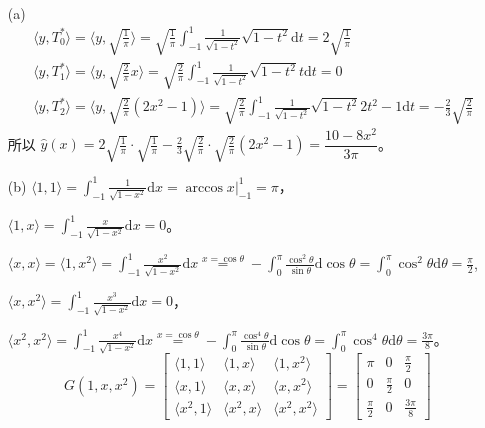 \documentclass[lang=cn,a4paper,newtx,bibend=bibtex]{elegantpaper}
\newcommand{\dd}{\mathrm{d}}
\newcommand{\upset}[2]{\stackrel{#1}{#2}}
\newcommand{\Int}[4]{\int_{#1}^{#2}{#3}{\dd {#4}}}
\newcommand{\indot}[2]{\langle {#1}, {#2} \rangle}
\begin{document}
\begin{solution} ~~

\begin{enumerate}
\item[(a)] 
\begin{equation*}
\begin{aligned}
  &\indot{y}{T_0^*} = \indot{y}{\sqrt{\frac1{\pi}}} = \sqrt{\frac{1}{\pi}} \int_{-1}^1 \frac{1}{\sqrt{1 - t^2}} \sqrt{1 - t^2} \dd t = 2 \sqrt{\frac{1}{\pi}} \\
  &\indot{y}{T_1^*} = \indot{y}{\sqrt{\frac2{\pi}}x} = \sqrt{\frac{2}{\pi}} \int_{-1}^1 \frac{1}{\sqrt{1 - t^2}} \sqrt{1 - t^2} t \dd t = 0 \\
  &\indot{y}{T_2^*} = \indot{y}{\sqrt{\frac2{\pi}}(2x^2 - 1)} = \sqrt{\frac{2}{\pi}} \int_{-1}^1 \frac{1}{\sqrt{1 - t^2}}\sqrt{1 - t^2} 2t^2 - 1 \dd t = - \frac23 \sqrt{\frac2{\pi}}
\end{aligned}
\end{equation*}
所以 $\hat{y}(x) = 2\sqrt{\frac1{\pi}}\cdot\sqrt{\frac{1}{\pi}} - \frac23 \sqrt{\frac{2}{\pi}}\cdot\sqrt{\frac{2}{\pi}}(2x^2 - 1) = \dfrac{10 - 8x^2}{3\pi}$。
\item[(b)]
$\indot{1}{1} = \int_{-1}^{1} \frac{1}{\sqrt{1 - x^2}} \dd x = \arccos x \big|_{-1}^1 = \pi$，

$\indot{1}{x} = \Int{-1}{1}{\frac{x}{\sqrt{1 - x^2}}}{x} = 0$。

$\indot{x}{x} = \indot{1}{x^2} = \Int{-1}{1}{\frac{x^2}{\sqrt{1-x^2}}}{x}\upset{x = \cos \theta}{=} - \Int{0}{\pi}{\frac{\cos^2 \theta}{\sin \theta}}{\cos \theta} = \Int{0}{\pi}{\cos^2 \theta}{\theta} = \frac{\pi}2$,

$\indot{x}{x^2} = \Int{-1}{1}{\frac{x^3}{\sqrt{1 - x^2}}}{x} = 0$，

$\indot{x^2}{x^2} = \Int{-1}{1}{\frac{x^4}{\sqrt{1 - x^2}}}{x}\upset{x =\cos \theta}{=} -\Int{0}{\pi}{\frac{\cos^4\theta}{\sin \theta}}{\cos \theta}=\Int{0}{\pi}{\cos^4 \theta}{\theta} = \frac{3\pi}8$。
\[
  G(1, x, x^2) = \begin{bmatrix}
    \indot{1}{1} & \indot{1}{x} & \indot{1}{x^2} \\
    \indot{x}{1} & \indot{x}{x} & \indot{x}{x^2} \\
    \indot{x^2}{1} & \indot{x^2}{x} & \indot{x^2}{x^2}
  \end{bmatrix}
   = \begin{bmatrix}
    \pi & 0 & \frac{\pi}2 \\
    0 & \frac{\pi}2 & 0  \\
    \frac{\pi}2 & 0 & \frac{3\pi}8
  \end{bmatrix}
\]


\end{enumerate}
\end{solution}
\end{document}
